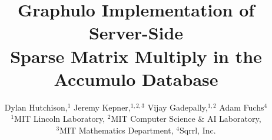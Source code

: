 \documentclass[conference]{IEEEtran}
\begin{document}
\title{Graphulo Implementation of Server-Side \\ Sparse Matrix Multiply in the Accumulo Database}



\author[D. Hutchison et al.]
       {Dylan Hutchison,$^1$ Jeremy Kepner,$^{1,2,3}$ Vijay Gadepally,$^{1,2}$ Adam Fuchs$^4$ \vspace{6pt}
         \\
         $^1$MIT Lincoln Laboratory, 
         $^2$MIT Computer Science \& AI Laboratory, \\
         $^3$MIT Mathematics Department, 
         $^4$Sqrrl, Inc. \vspace{-1em}
       }


%

\maketitle
\end{document}
